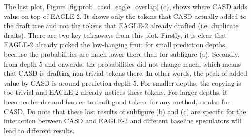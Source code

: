 The last plot, Figure \ref{fig:prob_casd_eagle_overlap} (c), shows where CASD adds value on top of EAGLE-2. It shows only the tokens that CASD actually added to the draft tree and not the tokens that EAGLE-2 already drafted (i.e. duplicate drafts). There are two key takeaways from this plot. Firstly, it is clear that EAGLE-2 already picked the low-hanging fruit for small prediction depths, because the probabilities are much lower there than for subfigure (a). Secondly, from depth 5 and onwards, the probabilities did not change much, which means that CASD is drafting non-trivial tokens there. In other words, the peak of added value by CASD is around prediction depth 5. For smaller depths, the copying is too trivial and EAGLE-2 already notices these tokens. For larger depths, it becomes harder and harder to draft good tokens for any method, so also for CASD. Do note that these last results of subfigure (b) and (c) are specific for the interaction between CASD and EAGLE-2 and different baseline speculators will lead to different results.

